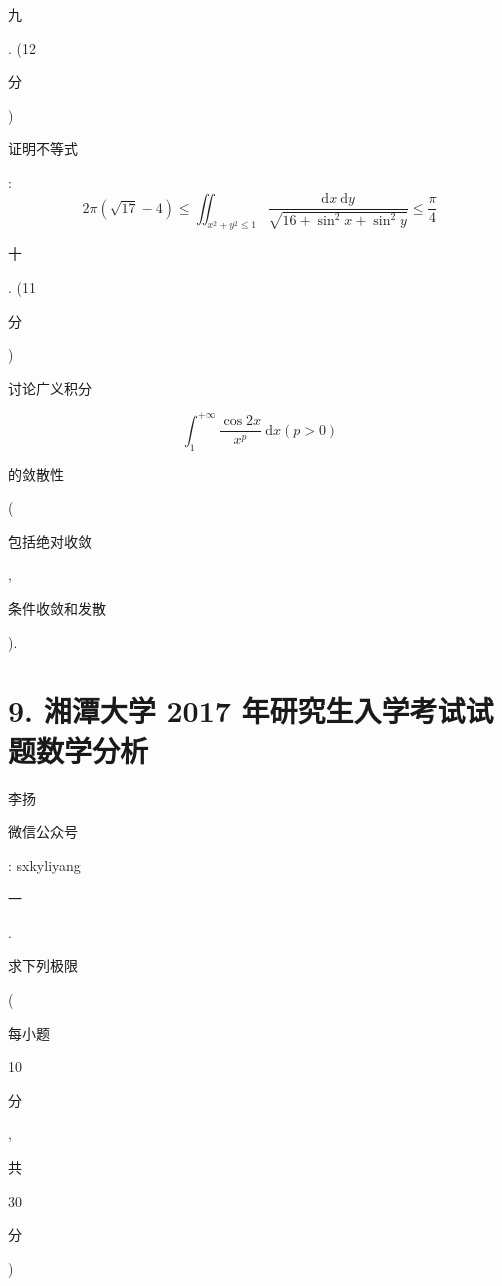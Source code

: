 \documentclass[10pt]{article}
\begin{document}
\begin{CJK}{UTF8}{mj}九\end{CJK}. (12 \begin{CJK}{UTF8}{mj}分\end{CJK}) \begin{CJK}{UTF8}{mj}证明不等式\end{CJK}:
$$
2 \pi(\sqrt{17}-4) \leqslant \iint_{x^{2}+y^{2} \leqslant 1} \frac{\mathrm{d} x \mathrm{~d} y}{\sqrt{16+\sin ^{2} x+\sin ^{2} y}} \leqslant \frac{\pi}{4}
$$
\begin{CJK}{UTF8}{mj}十\end{CJK}. (11 \begin{CJK}{UTF8}{mj}分\end{CJK}) \begin{CJK}{UTF8}{mj}讨论广义积分\end{CJK}
$$
\int_{1}^{+\infty} \frac{\cos 2 x}{x^{p}} \mathrm{~d} x(p>0)
$$
\begin{CJK}{UTF8}{mj}的敛散性\end{CJK} (\begin{CJK}{UTF8}{mj}包括绝对收敛\end{CJK}, \begin{CJK}{UTF8}{mj}条件收敛和发散\end{CJK}).

\section{9. 湘潭大学 2017 年研究生入学考试试题数学分析}
\begin{CJK}{UTF8}{mj}李扬\end{CJK}

\begin{CJK}{UTF8}{mj}微信公众号\end{CJK}: sxkyliyang

\begin{CJK}{UTF8}{mj}一\end{CJK}. \begin{CJK}{UTF8}{mj}求下列极限\end{CJK} (\begin{CJK}{UTF8}{mj}每小题\end{CJK} 10 \begin{CJK}{UTF8}{mj}分\end{CJK}, \begin{CJK}{UTF8}{mj}共\end{CJK} 30 \begin{CJK}{UTF8}{mj}分\end{CJK})
\end{document}

